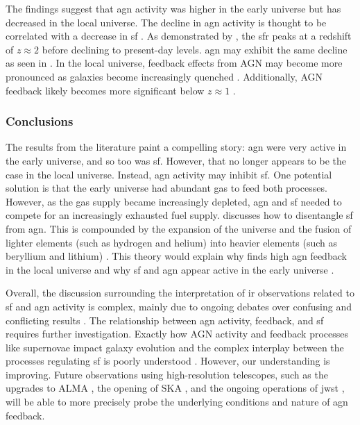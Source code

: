 The findings suggest that \gls{agn} activity was higher in the early universe but has decreased in the local universe. The decline in \gls{agn} activity is thought to be correlated with a decrease in \gls{sf} \citep{fanidakis_evolution_2012}. As demonstrated by \cite{madau_cosmic_2014}, the \gls{sfr} peaks at a redshift of $z \approx 2$ before declining to present-day levels. \gls{agn} may exhibit the same decline as seen in \citep{aird_evolution_2015, symeonidis_agn_2021}. In the local universe, feedback effects from AGN may become more pronounced as galaxies become increasingly quenched \citep{frias_castillo_at_2024}. Additionally, AGN feedback likely becomes more significant below $z \approx 1$ \citep{katsianis_evolution_2017}.

\subsubsection{Conclusions}
The results from the literature paint a compelling story: \gls{agn} were very active in the early universe, and so too was \gls{sf}. However, that no longer appears to be the case in the local universe. Instead, \gls{agn} activity may inhibit \gls{sf}. One potential solution is that the early universe had abundant gas to feed both processes. However, as the gas supply became increasingly depleted, \gls{agn} and \gls{sf} needed to compete for an increasingly exhausted fuel supply.  discusses how to disentangle \gls{sf} from \gls{agn}. This is compounded by the expansion of the universe and the fusion of lighter elements (such as hydrogen and helium) into heavier elements (such as beryllium and lithium) \citep{bromm_formation_2002}. This theory would explain why \cite{katsianis_evolution_2017} finds high \gls{agn} feedback in the local universe and why \gls{sf} and \gls{agn} appear active in the early universe \citep{kormendy_coevolution_2013, heckman_coevolution_2014, king_powerful_2015, blandford_relativistic_2019}.

Overall, the discussion surrounding the interpretation of \gls{ir} observations related to \gls{sf} and \gls{agn} activity is complex, mainly due to ongoing debates over confusing and conflicting results \citep{grazian_galaxy_2015}. The relationship between \gls{agn} activity, feedback, and \gls{sf} requires further investigation. Exactly how AGN activity and feedback processes like supernovae impact galaxy evolution and the complex interplay between the processes regulating \gls{sf} is poorly understood \citep{grazian_galaxy_2015}. However, our understanding is improving. Future observations using high-resolution telescopes, such as the upgrades to ALMA \citep{carpenter_alma_2023}, the opening of SKA \citep{dewdney_square_2009}, and the ongoing operations of \gls{jwst} \citep{gardner_james_2006}, will be able to more precisely probe the underlying conditions and nature of \gls{agn} feedback.